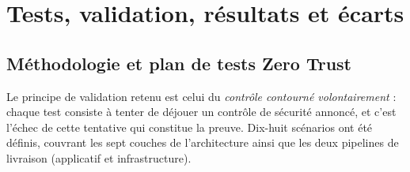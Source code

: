 \chapter{Tests, validation, résultats et écarts}
\label{ch:tests}

\section{Méthodologie et plan de tests Zero Trust}

Le principe de validation retenu est celui du \emph{contrôle contourné volontairement} :
chaque test consiste à tenter de déjouer un contrôle de sécurité annoncé, et c'est l'échec
de cette tentative qui constitue la preuve. Dix-huit scénarios ont été définis, couvrant les
sept couches de l'architecture ainsi que les deux pipelines de livraison (applicatif et
infrastructure).

